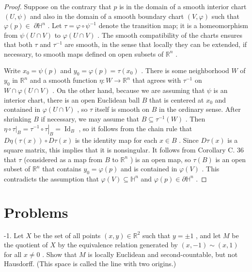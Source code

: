 \begin{proof}
\leanok
Suppose on the contrary that $p$ is in the domain of a smooth interior chart $\left( {U,\psi }\right)$ and also in the domain of a smooth boundary chart $\left( {V,\varphi }\right)$ such that $\varphi \left( p\right)  \in \; \partial {\mathbb{H}}^{n}$ . Let $\tau  = \varphi  \circ  {\psi }^{-1}$ denote the transition map; it is a homeomorphism from $\psi \left( {U \cap  V}\right)$ to $\varphi \left( {U \cap  V}\right)$ . The smooth compatibility of the charts ensures that both $\tau$ and ${\tau }^{-1}$ are smooth, in the sense that locally they can be extended, if necessary, to smooth maps defined on open subsets of ${\mathbb{R}}^{n}$ .

Write ${x}_{0} = \psi \left( p\right)$ and ${y}_{0} = \varphi \left( p\right)  = \tau \left( {x}_{0}\right)$ . There is some neighborhood $W$ of ${y}_{0}$ in ${\mathbb{R}}^{n}$ and a smooth function $\eta  : W \rightarrow  {\mathbb{R}}^{n}$ that agrees with ${\tau }^{-1}$ on $W \cap  \varphi \left( {U \cap  V}\right)$ . On the other hand, because we are assuming that $\psi$ is an interior chart, there is an open Euclidean ball $B$ that is centered at ${x}_{0}$ and contained in $\varphi \left( {U \cap  V}\right)$ , so $\tau$ itself is smooth on $B$ in the ordinary sense. After shrinking $B$ if necessary, we may assume that $B \subseteq  {\tau }^{-1}\left( W\right)$ . Then ${\left. \eta  \circ  \tau \right| }_{B} = {\left. {\tau }^{-1} \circ  \tau \right| }_{B} = {\operatorname{Id}}_{B}$ , so it follows from the chain rule that ${D\eta }\left( {\tau \left( x\right) }\right)  \circ  {D\tau }\left( x\right)$ is the identity map for each $x \in  B$ . Since ${D\tau }\left( x\right)$ is a square matrix, this implies that it is nonsingular. It follows from Corollary C. 36 that $\tau$ (considered as a map from $B$ to ${\mathbb{R}}^{n}$ ) is an open map, so $\tau \left( B\right)$ is an open subset of ${\mathbb{R}}^{n}$ that contains ${y}_{0} = \varphi \left( p\right)$ and is contained in $\varphi \left( V\right)$ . This contradicts the assumption that $\varphi \left( V\right)  \subseteq  {\mathbb{H}}^{n}$ and $\varphi \left( p\right)  \in  \partial {\mathbb{H}}^{n}$ .
\end{proof}


\section{Problems}

\begin{exercise}
\label{prob:1-1}
-1. Let $X$ be the set of all points $\left( {x, y}\right)  \in  {\mathbb{R}}^{2}$ such that $y =  \pm  1$ , and let $M$ be the quotient of $X$ by the equivalence relation generated by $\left( {x, - 1}\right)  \sim  \left( {x,1}\right)$ for all $x \neq  0$ . Show that $M$ is locally Euclidean and second-countable, but not Hausdorff. (This space is called the line with two origins.)
\end{exercise}

